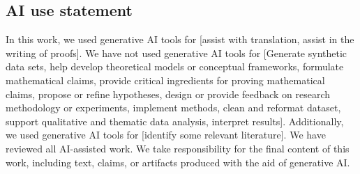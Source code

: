 \documentclass[twoside]{article}
\theoremstyle{definition}
\theoremstyle{remark}
\begin{document}

\clearpage
\subsection*{AI use statement}


In this work, we used generative AI tools for [assist with translation, assist in the writing of proofs].
We have not used generative AI tools for [Generate synthetic data sets, help develop theoretical models or conceptual frameworks, formulate mathematical claims, provide critical ingredients for proving mathematical claims, propose or refine hypotheses, design or provide feedback on research  methodology or experiments, implement methods, clean and reformat dataset, support qualitative and thematic data analysis, interpret results]. %
Additionally, we used generative AI tools for [identify some relevant literature].
We have reviewed all AI-assisted work.
We take responsibility for the final content of this work, including text, claims, or artifacts produced with the aid of generative AI.



\end{document}
